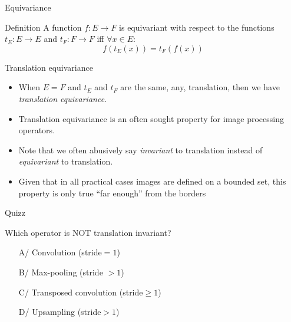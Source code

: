 \documentclass[xcolor=pdftex,dvipsnames,table,mathserif]{beamer}
\begin{document}
\begin{frame}{Equivariance}

\begin{block}{Definition}
  A function $f: E \longrightarrow F$ is \alert{equivariant} with respect to the functions $t_E: E \longrightarrow E$ and $t_F: F \longrightarrow F$ iff $\forall x \in E$:
  \[
  f(t_E(x)) = t_F(f(x))
  \]
\end{block}

\end{frame}

\begin{frame}{Translation equivariance}

\begin{itemize}
  \item When $E=F$ and $t_E$ and $t_F$ are the same, any, translation, then we have \emph{translation equivariance}.
\item Translation equivariance is an often sought property for image processing operators.
\item Note that we often abusively say \emph{invariant} to translation instead of \emph{equivariant} to translation.
\item Given that in all practical cases images are defined on a bounded set, this property is only true ``far enough'' from the borders
\end{itemize}

\end{frame}


\begin{frame}{Quizz}

  \begin{block}{Which operator is NOT translation invariant?}
    \begin{itemize}
    \item[A/] Convolution (stride$=1$)
    \item[B/] Max-pooling (stride $>1$)
    \item[C/] Transposed convolution (stride$\geq 1$)
    \item[D/] Upsampling (stride$>1$)
    \end{itemize}
  \end{block}

\end{frame}
\end{document}
